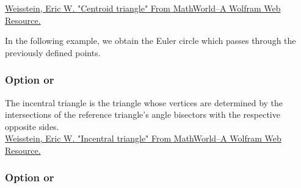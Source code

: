 \href{http://mathworld.wolfram.com/TriangleCentroid.html}{Weisstein, Eric W. "Centroid triangle" From MathWorld--A Wolfram Web Resource.}

In the following example, we obtain the Euler circle which passes through the previously defined points.

\begin{tkzexample}[latex=7cm,small]
\end{tkzexample}

\subsubsection{Option  or  }

The incentral triangle is the triangle whose vertices are determined by
the intersections of the reference triangle’s angle bisectors with the
respective opposite sides.
\\
\href{http://mathworld.wolfram.com/ContactTriangle.html}{Weisstein, Eric W. "Incentral triangle" From MathWorld--A Wolfram Web Resource.}


\begin{tkzexample}[latex=7cm,small]
\end{tkzexample}

\subsubsection{Option  or  }

